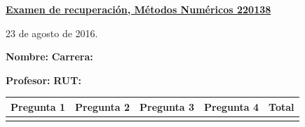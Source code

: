 \documentclass[11pt]{article}
\begin{document}
\hspace*{-1,5cm}

\vspace*{0.5cm} \centerline {\bf\underline{Examen de recuperaci\'on, M\'etodos Num\'ericos 220138 }}
\centerline{\textrm{23 de agosto de 2016.}}  \vspace{0.2cm}


\textbf{Nombre:} \hspace{0.5\textwidth}\textbf{Carrera:}

\vspace{0.1cm}
\textbf{Profesor:}\hspace{0.5\textwidth} \textbf{ RUT:}

\begin{center}
 \begin{tabular}{||p{2cm}|p{2cm}|p{2cm}|p{2cm}||p{2cm}||}
 \hline
 Pregunta 1 &  Pregunta 2 &     Pregunta 3  & Pregunta 4 &Total\\
 \hline

  \vspace{1.5cm} & & & & \\
 \hline
 \end{tabular}
 \end{center}
\end{document}
